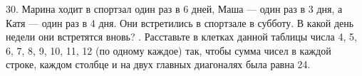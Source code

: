 30. Марина ходит в спортзал один раз в 6 дней, Маша --- один раз в 3 дня, а Катя --- один раз в 4 дня. Они встретились в спортзале в субботу. В какой день недели они встретятся вновь?
\newpage
{}. Расставьте в клетках данной таблицы числа 4, 5, 6, 7, 8, 9, 10, 11, 12 (по одному каждое) так, чтобы сумма чисел в каждой строке, каждом столбце и на двух главных диагоналях была равна 24.
\begin{center}
\begin{figure}[ht!]
\end{figure}
\end{center}
